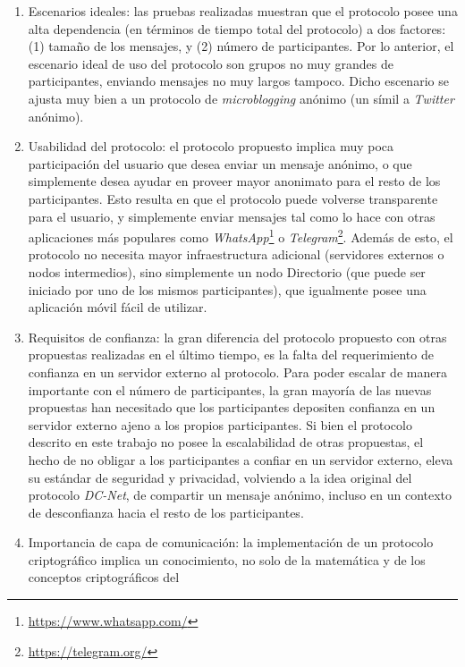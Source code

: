 \begin{enumerate}
    \item Escenarios ideales: las pruebas realizadas muestran que el protocolo posee una 
    alta dependencia (en términos de tiempo total del protocolo) a dos factores: 
    (1) tamaño de los mensajes, y (2) número de participantes. Por lo anterior, el escenario 
    ideal de uso del protocolo son grupos no muy grandes de participantes, enviando mensajes 
    no muy largos tampoco. Dicho escenario se ajusta muy bien a un protocolo de 
    \emph{microblogging} anónimo (un símil a \emph{Twitter} anónimo).
    \item Usabilidad del protocolo: el protocolo propuesto implica muy poca participación 
    del usuario que desea enviar un mensaje anónimo, o que simplemente desea ayudar en proveer 
    mayor anonimato para el resto de los participantes. Esto resulta en que el protocolo 
    puede volverse transparente para el usuario, y simplemente enviar mensajes tal como lo hace 
    con otras aplicaciones más populares como 
    \emph{WhatsApp}\footnote{\url{https://www.whatsapp.com/}} o 
    \emph{Telegram}\footnote{\url{https://telegram.org/}}. 
    Además de esto, el protocolo no necesita mayor infraestructura adicional (servidores externos o 
    nodos intermedios), sino 
    simplemente un nodo Directorio (que puede ser iniciado por uno de los mismos participantes), 
    que igualmente posee una aplicación móvil fácil de utilizar.
    \item Requisitos de confianza: la gran diferencia del protocolo propuesto con 
    otras propuestas realizadas en el último tiempo, es la falta del requerimiento de 
    confianza en un servidor externo al protocolo. Para poder escalar de manera importante 
    con el número de participantes, la gran mayoría de las nuevas propuestas han necesitado 
    que los participantes depositen confianza en un servidor externo ajeno a los propios 
    participantes. Si bien el protocolo descrito en este trabajo no posee la escalabilidad 
    de otras propuestas, el hecho de no obligar a los participantes a confiar en un servidor 
    externo, eleva su estándar de seguridad y privacidad, volviendo a la idea original del 
    protocolo \emph{DC-Net}, de compartir un mensaje anónimo, incluso en un contexto de 
    desconfianza hacia el resto de los participantes. 
    \item Importancia de capa de comunicación: la implementación de un protocolo criptográfico 
    implica un conocimiento, no solo de la matemática y de los conceptos criptográficos del 

\end{enumerate}
